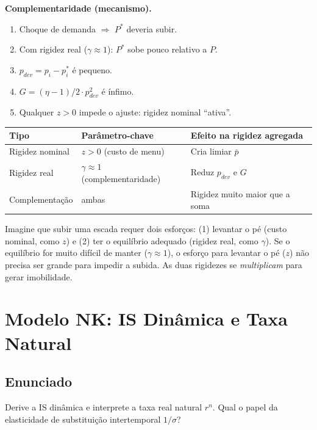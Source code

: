 \documentclass[12pt, a4paper]{article}
\begin{document}
\textbf{Complementaridade (mecanismo).}
\begin{enumerate}[leftmargin=1.5em, itemsep=2pt]
  \item Choque de demanda $\Rightarrow$ $P^*$ deveria subir.
  \item Com rigidez real ($\gamma\approx 1$): $P^*$ sobe pouco relativo a $P$.
  \item $p_{dev} = p_i - p_i^*$ é pequeno.
  \item $G = (\eta-1)/2 \cdot p_{dev}^2$ é ínfimo.
  \item Qualquer $z > 0$ impede o ajuste: rigidez nominal ``ativa''.
\end{enumerate}

\begin{resultbox}[title={Ball-Romer: multiplicação de rigidezes (Q5)}]
\begin{center}
\begin{tabular}{lll}
\toprule
Tipo & Parâmetro-chave & Efeito na rigidez agregada \\
\midrule
Rigidez nominal & $z > 0$ (custo de menu) & Cria limiar $\bar{p}$ \\
Rigidez real & $\gamma\approx 1$ (complementaridade) & Reduz $p_{dev}$ e $G$ \\
Complementação & ambas & Rigidez muito maior que a soma \\
\bottomrule
\end{tabular}
\end{center}
\end{resultbox}

\begin{provabox}[title={Analogia intuitiva (Q5)}]
Imagine que subir uma escada requer dois esforços: (1) levantar o pé (custo nominal,
como $z$) e (2) ter o equilíbrio adequado (rigidez real, como $\gamma$).
Se o equilíbrio for muito difícil de manter ($\gamma\approx 1$), o esforço para levantar
o pé ($z$) não precisa ser grande para impedir a subida. As duas rigidezes se
\emph{multiplicam} para gerar imobilidade.
\end{provabox}

\section{Modelo NK: IS Dinâmica e Taxa Natural}

\subsection*{Enunciado}
Derive a IS dinâmica e interprete a taxa real natural $r^n$. Qual o papel da
elasticidade de substituição intertemporal $1/\sigma$?
\end{document}
